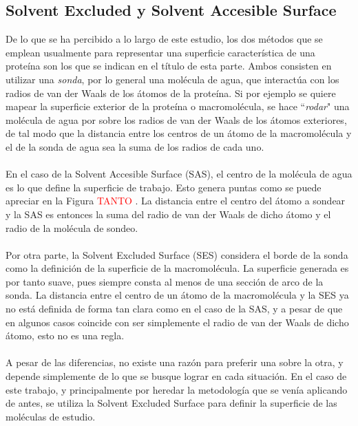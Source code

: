 \documentclass[12pt, oneside, numbers, spanish]{ezthesis}
\numberwithin{equation}{section}
\begin{document}
\subsection{Solvent Excluded y Solvent Accesible Surface}
De lo que se ha percibido a lo largo de este estudio, los dos métodos que se emplean usualmente para representar una superficie característica de una proteína son los que se indican en el título de esta parte. Ambos consisten en utilizar una \textit{sonda}, por lo general una molécula de agua, que interactúa con los radios de van der Waals de los átomos de la proteína. Si por ejemplo se quiere mapear la superficie exterior de la proteína o macromolécula, se hace ``\textit{rodar}" una molécula de agua por sobre los radios de van der Waals de los átomos exteriores, de tal modo que la distancia entre los centros de un átomo de la macromolécula y el de la sonda de agua sea la suma de los radios de cada uno.\\\\
En el caso de la Solvent Accesible Surface (SAS), el centro de la molécula de agua es lo que define la superficie de trabajo. Esto genera puntas como se puede apreciar en la Figura \textcolor{red}{TANTO} . La distancia entre el centro del átomo a sondear y la SAS es entonces la suma del radio de van der Waals de dicho átomo y el radio de la molécula de sondeo.\\\\
Por otra parte, la Solvent Excluded Surface (SES) considera el borde de la sonda como la definición de la superficie de la macromolécula. La superficie generada es por tanto suave, pues siempre consta al menos de una sección de arco de la sonda. La distancia entre el centro de un átomo de la macromolécula y la SES ya no está definida de forma tan clara como en el caso de la SAS, y a pesar de que en algunos casos coincide con ser simplemente el radio de van der Waals de dicho átomo, esto no es una regla.\\\\
A pesar de las diferencias, no existe una razón para preferir una sobre la otra, y depende simplemente de lo que se busque lograr en cada situación. En el caso de este trabajo, y principalmente por heredar la metodología que se venía aplicando de antes, se utiliza la Solvent Excluded Surface para definir la superficie de las moléculas de estudio.
\end{document}
